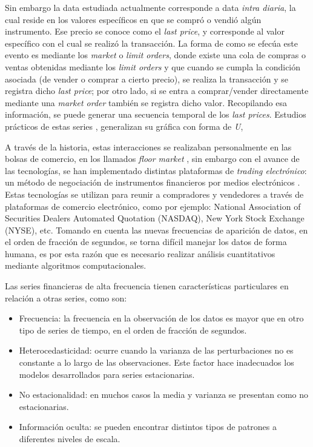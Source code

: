 Sin embargo la data estudiada actualmente corresponde a data \emph{intra diaria}, la cual reside en los valores específicos en que se compró o vendió algún instrumento. 
Ese precio se conoce como el \emph{last price}, y corresponde al valor específico con el cual se realizó la transacción. La forma de como se efecúa este evento es 
mediante los \emph{market} o \emph{limit orders}, donde existe una cola de compras o ventas obtenidas mediante los \emph{limit orders} y que cuando se cumpla la 
condición asociada (de vender o comprar a cierto precio), se realiza la transacción y se registra dicho \emph{last price}; 
por otro lado, si se entra a comprar/vender directamente mediante una \emph{market order} también se registra dicho valor. Recopilando esa información, 
se puede generar una secuencia temporal de los \emph{last prices}. Estudios prácticos de estas series \cite{biais2012empirical}, generalizan su gráfica con forma de \emph{U},

A través de la historia, estas interacciones se realizaban personalmente en las bolsas de comercio, en los llamados \emph{floor market} \cite{jain2005financial},
sin embargo con el avance de las tecnologías, se han implementado distintas plataformas de \emph{trading electrónico}: un método de negociación de instrumentos 
financieros por medios electrónicos \cite{weston2002electronic}. Estas tecnologías se utilizan para reunir a compradores y vendedores a través de plataformas de comercio 
electrónico, como por ejemplo: National Association of Securities Dealers Automated Quotation (NASDAQ), New York Stock Exchange (NYSE), etc. Tomando en cuenta las nuevas 
frecuencias de aparición de datos, en el orden de fracción de segundos, se torna difícil manejar los datos de forma humana, es por esta razón que es necesario realizar análisis 
cuantitativos mediante algoritmos computacionales.

Las series financieras de alta frecuencia tienen características particulares en relación a otras series, como son: 
\begin{itemize}
	\item Frecuencia: la frecuencia en la observación de los datos es mayor que en otro tipo de series de tiempo, en el orden de fracción de segundos.
	\item Heterocedasticidad: ocurre cuando la varianza de las perturbaciones no es constante a lo largo de las observaciones.
		Este factor hace inadecuados los modelos desarrollados para series estacionarias.
	\item No estacionalidad: en muchos casos la media y varianza se presentan como no estacionarias.
	\item Información oculta: se pueden encontrar distintos tipos de patrones a diferentes niveles de escala.
\end{itemize}


